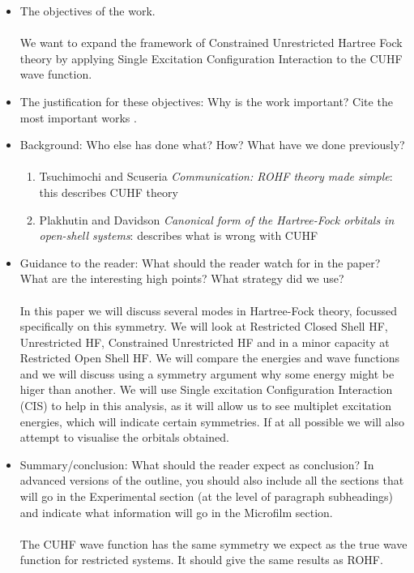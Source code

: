 \documentclass[twoside,twocolumn,9pt]{article}
\begin{document}
\begin{itemize}
    \item The objectives of the work. 
    \paragraph*{}
    We want to expand the framework of Constrained Unrestricted Hartree Fock theory by applying Single Excitation Configuration 
    Interaction to the CUHF wave function.
    \item The justification for these objectives: Why is the work important? Cite the most important works \cite{whitesides2004a}.
    \item Background: Who else has done what? How? What have we done previously?
    \paragraph*{}
    \begin{enumerate}
      \item Tsuchimochi and Scuseria \textit{Communication: ROHF theory made simple}: this describes CUHF theory
      \item Plakhutin and Davidson \textit{Canonical form of the Hartree-Fock orbitals in open-shell systems}: describes what is wrong with CUHF
    \end{enumerate}
    \item Guidance to the reader: What should the reader watch for in the paper? What are the interesting high points? What strategy did we use?
    \paragraph*{}
    In this paper we will discuss several modes in Hartree-Fock theory, focussed specifically on this symmetry. We will look at Restricted Closed
Shell HF, Unrestricted HF, Constrained Unrestricted HF and in a minor capacity at Restricted Open Shell HF. We will compare the energies
and wave functions and we will discuss using a symmetry argument why some energy might be higer than another. We will use 
Single excitation Configuration Interaction (CIS) to help in this analysis, as it will allow us to see multiplet excitation energies, 
which will indicate certain symmetries. If at all possible we will also attempt to visualise the orbitals obtained. 
    \item Summary/conclusion: What should the reader expect as conclusion? In advanced versions of the outline, you should also include all the sections that will go in the Experimental section (at the level of paragraph subheadings) and indicate what information will go in the Microfilm section.
    \paragraph*{}
    The CUHF wave function has the same symmetry we expect as the true wave function for restricted systems. It should give the same results as ROHF.
\end{itemize}
\end{document}
